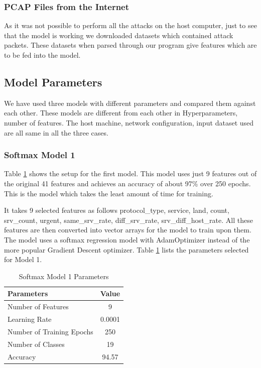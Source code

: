 \documentclass[12pt]{article}
\theoremstyle{definition}
\begin{document}
			\subsubsection{PCAP Files from the Internet}
			As it was not possible to perform all the attacks on the host computer, just to see that the model is working we downloaded datasets which contained attack packets. These datasets when parsed through our program give features which are to be fed into the model.
			
			
		\subsection{Model Parameters}
			We have used three models with different parameters and compared them against each other. These models are different from each other in Hyperparameters, number of features. The host machine, network configuration, input dataset used are all same in all the three cases.
			\subsubsection{Softmax Model 1}
			Table \ref{tab:model-1-params} shows the setup for the first model. This model uses just 9 features out of the original 41 features and achieves an accuracy of about 97\% over 250 epochs. This is the model which takes the least amount of time for training. 
			
			It takes 9 selected features as follows  protocol\_type, service, land, count, srv\_count, urgent, same\_srv\_rate, diff\_srv\_rate, srv\_diff\_host\_rate. All these features are then converted into vector arrays for the model to train upon them. The model uses a softmax regression model with AdamOptimizer instead of the more popular Gradient Descent optimizer. Table \ref{tab:model-1-params} lists the parameters selected for Model 1.
			
			\begin{table}[h!]
				\centering
				\caption{Softmax Model 1 Parameters}
				\label{tab:model-1-params}
				\begin{tabular}{|l|c|}
					\hline
					\bfseries{Parameters} & \textbf{Value} \\ \hline
					Number of Features & 9 \\
					Learning Rate & 0.0001 \\
					Number of Training Epochs & 250 \\
					Number of Classes & 19 \\ 
					Accuracy & 94.57 \\
					\hline	
				\end{tabular}
				
			\end{table}
		
\end{document}

